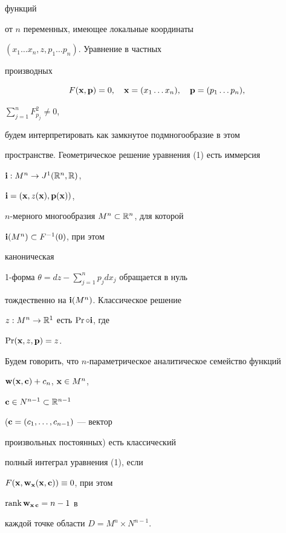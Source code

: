 функций


от $n$ переменных, имеющее локальные координаты


$(x_1\dotsc x_n,z,p_1\dotsc p_n)$. Уравнение в частных


производных


\begin{equation}


F(\bold x,\bold p)=0,\quad


\bold x=(x_1\dotsc x_n),\quad \bold p=(p_1\dotsc p_n),


\end{equation}


$\sum\limits^n_{j=1}F^2_{p_j}\ne 0$,


будем интерпретировать как замкнутое подмногообразие в этом


пространстве. Геометрическое решение уравнения (1) есть иммерсия


$\bold i:M^n\to J^1(\Bbb R^n,\Bbb R)$,


$\bold i=(\bold x,z(\bold x),\bold p(\bold x))$,


$n$-мерного многообразия $M^n\subset\Bbb R^n$, для которой


$\bold i(M^n)\subset F^{-1}(0)$, при этом


каноническая


1-форма $\theta=dz-\sum\limits^n_{j=1}p_j dx_j$ обращается в нуль


тождественно на $\bold i(M^n)$. Классическое решение


$z:M^n\to\Bbb R^1$ есть $\Pr\circ\bold i$, где


$\Pr(\bold x,z,\bold p)=z$.





Будем говорить, что $n$-параметрическое аналитическое семейство функций


$\bold w(\bold x,\bold c)+c_n$, $\bold x\in M^n$,


$\bold c\in N^{n-1}\subset\Bbb R^{n-1}$


($\bold c=(c_1,\dotsc,c_{n-1})$ --- вектор


произвольных постоянных) есть классический


полный интеграл уравнения (1), если


$F(\bold x,\bold w_{\bold x}(\bold x,\bold c))\equiv 0$, при этом


$\operatorname{rank}\bold w_{\bold x\,\bold c}=n-1$ в


каждой точке области $D=M^n\times N^{n-1}$.





